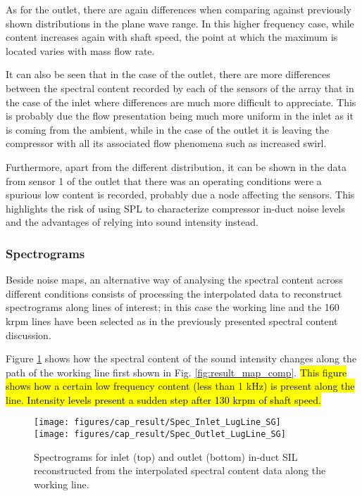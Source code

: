 As for the outlet, there are again differences when comparing against previously shown distributions in the plane wave range. In this higher frequency case, while content increases again with shaft speed, the point at which the maximum is located varies with mass flow rate.

It can also be seen that in the case of the outlet, there are more differences between the spectral content recorded by each of the sensors of the array that in the case of the inlet where differences are much more difficult to appreciate. This is probably due the flow presentation being much more uniform in the inlet as it is coming from the ambient, while in the case of the outlet it is leaving the compressor with all its associated flow phenomena such as increased swirl.

Furthermore, apart from the different distribution, it can be shown in the data from sensor 1 of the outlet that there was an operating conditions were a spurious low content is recorded, probably due a node affecting the sensors. This highlights the risk of using SPL to characterize compressor in-duct noise levels and the advantages of relying into sound intensity instead.

\subsubsection{Spectrograms}

Beside noise maps, an alternative way of analysing the spectral content across different conditions consists of processing the interpolated data to reconstruct spectrograms along lines of interest; in this case the working line and the 160 krpm lines have been selected as in the previously presented spectral content discussion.

Figure \ref{fig:result_LugLine_SG} shows how the spectral content of the sound intensity changes along the path of the working line first shown in Fig. \ref{fig:result_map_comp}. \hl{This figure shows how a certain low frequency content (less than 1 kHz) is present along the line. Intensity levels present a sudden step after 130 krpm of shaft speed.}

\begin{figure}[tbh!]
\centering
\texttt{[image: figures/cap\_result/Spec\_Inlet\_LugLine\_SG]}\\[5mm]
\texttt{[image: figures/cap\_result/Spec\_Outlet\_LugLine\_SG]}
\caption{Spectrograms for inlet (top) and outlet (bottom) in-duct SIL reconstructed from the interpolated spectral content data along the working line.}
\label{fig:result_LugLine_SG}
\end{figure}

